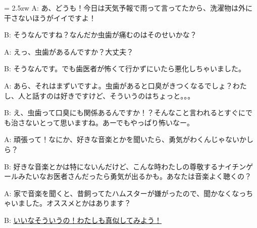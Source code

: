 \documentclass[11pt]{amsart}
\title{}
\author{}
\newenvironment{hangall}[1]{\hangindent = 2.5zw\everypar{\hangindent = 2.5zw}}{}
\begin{document}
\maketitle
\begin{hangall}{}%
A: あ、どうも！今日は天気予報で雨って言ってたから、洗濯物は外に干さないほうがイイですよ！

B: そうなんですね？なんだか虫歯が痛むのはそのせいかな？

A: えっ、虫歯があるんですか？大丈夫？

B: そうなんです。でも歯医者が怖くて行かずにいたら悪化しちゃいました。

A: あら、それはまずいですよ。虫歯があると口臭がきつくなるでしょ？わたし、人と話すのは好きですけど、そういうのはちょっと。。。

B: え、虫歯って口臭にも関係あるんですか！？そんなこと言われるとすぐにでも治さないとって思いますね。あーでもやっぱり怖いなー。

A: 頑張って！なにか、好きな音楽とかを聞いたら、勇気がわくんじゃないかしら？

B: 好きな音楽とかは特にないんだけど、こんな時わたしの尊敬するナイチンゲールみたいなお医者さんだったら勇気が出るかも。あなたは音楽よく聴くの？

A: 家で音楽を聞くと、昔飼ってたハムスターが嫌がったので、聞かなくなっちゃいました。オススメとかはあります？

B: \ul{いいなそういうの！わたしも真似してみよう！}\end{hangall}
\end{document}
